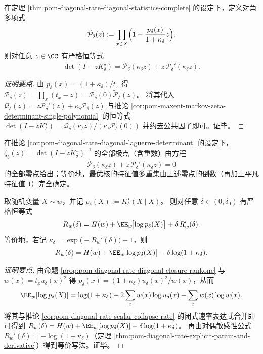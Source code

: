 \begin{corollary}\label{cor:pom-diagonal-rate-diagonal-laguerre-determinant}
在定理 \ref{thm:pom-diagonal-rate-diagonal-statistics-complete} 的设定下，定义对角多项式
\[
\widetilde{\mathcal P}_\delta(z):=\prod_{x\in X}\Bigl(1-\frac{p_\delta(x)}{1+\kappa_\delta}z\Bigr).
\]
则对任意 \(z\in\CC\) 有严格恒等式
\[
\det(I-zK^\star_\delta)=\widetilde{\mathcal P}_\delta(\kappa_\delta z)+z\,\widetilde{\mathcal P}_\delta'(\kappa_\delta z).
\]
\end{corollary}
\begin{proof}[证明要点]
由 \(p_\delta(x)=(1+\kappa_\delta)/t_x\) 得
\(
\mathcal P_\delta(z)=\prod_x(t_x-z)=\mathcal P_\delta(0)\widetilde{\mathcal P}_\delta(z)
\)。
将其代入
\(
\mathcal Q_\delta(z)=z\mathcal P_\delta'(z)+\kappa_\delta\mathcal P_\delta(z)
\)
与推论 \ref{cor:pom-maxent-markov-zeta-determinant-single-polynomial} 的恒等式
\(
\det(I-zK^\star_\delta)=\mathcal Q_\delta(\kappa_\delta z)/(\kappa_\delta\mathcal P_\delta(0))
\)
并约去公共因子即可。证毕。
\end{proof}

\begin{corollary}\label{cor:pom-diagonal-rate-diagonal-determines-spectrum}
在推论 \ref{cor:pom-diagonal-rate-diagonal-laguerre-determinant} 的设定下，
\(\zeta_\delta(z)=\det(I-zK^\star_\delta)^{-1}\) 的全部极点（含重数）由方程
\[
\widetilde{\mathcal P}_\delta(\kappa_\delta z)+z\,\widetilde{\mathcal P}_\delta'(\kappa_\delta z)=0
\]
的全部零点给出；等价地，最优核的特征值多重集由上述零点的倒数（再加上平凡特征值 \(1\)）完全确定。
\end{corollary}

\begin{corollary}\label{cor:pom-diagonal-rate-euler-diagonal-identity}
取随机变量 \(X\sim w\)，并记 \(p_\delta(X):=K^\star_\delta(X\mid X)\)。
则对任意 \(\delta\in(0,\delta_0)\) 有严格恒等式
\[
R_w(\delta)=H(w)+\EE_w\!\bigl[\log p_\delta(X)\bigr]+\delta\,R_w'(\delta).
\]
等价地，若记 \(\kappa_\delta=\exp\!\bigl(-R_w'(\delta)\bigr)-1\)，则
\[
R_w(\delta)=H(w)+\EE_w\!\bigl[\log p_\delta(X)\bigr]-\delta\log(1+\kappa_\delta).
\]
\end{corollary}
\begin{proof}[证明要点]
由命题 \ref{prop:pom-diagonal-rate-diagonal-closure-rankone} 与 \(w(x)=t_xu_\delta(x)^2\) 得
\(
p_\delta(x)=(1+\kappa_\delta)u_\delta(x)^2/w(x)
\)，从而
\[
\EE_w[\log p_\delta(X)]
=\log(1+\kappa_\delta)+2\sum_x w(x)\log u_\delta(x)-\sum_x w(x)\log w(x).
\]
将其与推论 \ref{cor:pom-diagonal-rate-scalar-collapse-rate} 的闭式速率表达式合并即可得到
\(
R_w(\delta)=H(w)+\EE_w[\log p_\delta(X)]-\delta\log(1+\kappa_\delta)
\)。
再由对偶敏感性公式 \(R_w'(\delta)=-\log(1+\kappa_\delta)\)（定理 \ref{thm:pom-diagonal-rate-explicit-param-and-derivative}）得到等价写法。证毕。
\end{proof}

